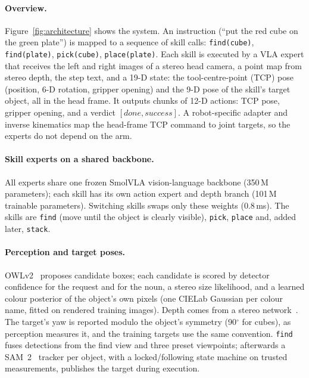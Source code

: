 \documentclass[conference]{IEEEtran}
\begin{document}
\paragraph{Overview.}
Figure~\ref{fig:architecture} shows the system. An instruction (``put the red cube on the green plate'') is mapped to a sequence of skill calls:
\texttt{find(cube)}, \texttt{find(plate)}, \texttt{pick(cube)}, \texttt{place(plate)}. Each skill is executed by a
VLA expert that receives the left and right images of a stereo head camera, a point map from stereo depth, the
step text, and a 19-D state: the tool-centre-point (TCP) pose (position, 6-D rotation, gripper opening) and the
9-D pose of the skill's target object, all in the head frame. It outputs chunks of 12-D actions: TCP pose, gripper
opening, and a verdict $[\textit{done}, \textit{success}]$. A robot-specific adapter and inverse kinematics map the
head-frame TCP command to joint targets, so the experts do not depend on the arm.

\paragraph{Skill experts on a shared backbone.}
All experts share one frozen SmolVLA vision-language backbone (350\,M parameters); each skill has its own
action expert and depth branch (101\,M trainable parameters). Switching skills swaps only these weights
(0.8\,ms). The skills are \texttt{find} (move until the object is clearly visible), \texttt{pick},
\texttt{place} and, added later, \texttt{stack}.

\paragraph{Perception and target poses.}
OWLv2~\cite{minderer2023owlv2} proposes candidate boxes; each candidate is scored by detector confidence for the
request and for the noun, a stereo size likelihood, and a learned colour posterior of the object's own pixels
(one CIELab Gaussian per colour name, fitted on rendered training images). Depth comes from a stereo
network~\cite{wen2025foundationstereo}. The target's yaw is reported modulo the object's symmetry (90$^\circ$ for
cubes), as perception measures it, and the training targets use the same convention. \texttt{find} fuses detections
from the find view and three preset viewpoints; afterwards a SAM~2~\cite{ravi2024sam2} tracker per object, with a
locked/following state machine on trusted measurements, publishes the target during execution.
\end{document}
